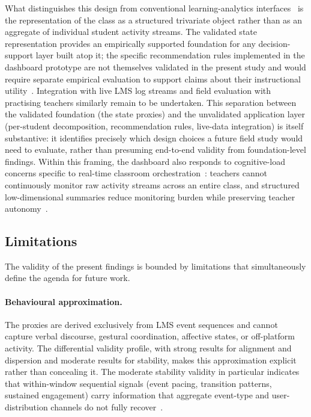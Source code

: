 \documentclass[preprint,12pt,authoryear]{elsarticle}
\begin{document}
What distinguishes this design from conventional learning-analytics interfaces~\citep{molenaar2019, martinez2021} is the representation of the class as a structured trivariate object rather than as an aggregate of individual student activity streams. The validated state representation provides an empirically supported foundation for any decision-support layer built atop it; the specific recommendation rules implemented in the dashboard prototype are not themselves validated in the present study and would require separate empirical evaluation to support claims about their instructional utility~\citep{dollinger2019, jarvela2023a}. Integration with live LMS log streams and field evaluation with practising teachers similarly remain to be undertaken. This separation between the validated foundation (the state proxies) and the unvalidated application layer (per-student decomposition, recommendation rules, live-data integration) is itself substantive: it identifies precisely which design choices a future field study would need to evaluate, rather than presuming end-to-end validity from foundation-level findings. Within this framing, the dashboard also responds to cognitive-load concerns specific to real-time classroom orchestration~\citep{kirschner2018}: teachers cannot continuously monitor raw activity streams across an entire class, and structured low-dimensional summaries reduce monitoring burden while preserving teacher autonomy~\citep{cukurova2022, martinez2022}.

\subsection{Limitations}
\label{sec:limitations}

The validity of the present findings is bounded by limitations that simultaneously define the agenda for future work.

\paragraph{Behavioural approximation.}
The proxies are derived exclusively from LMS event sequences and cannot capture verbal discourse, gestural coordination, affective states, or off-platform activity. The differential validity profile, with strong results for alignment and dispersion and moderate results for stability, makes this approximation explicit rather than concealing it. The moderate stability validity in particular indicates that within-window sequential signals (event pacing, transition patterns, sustained engagement) carry information that aggregate event-type and user-distribution channels do not fully recover~\citep{winne2020, saint2023, kovanovic2015}.
\end{document}

